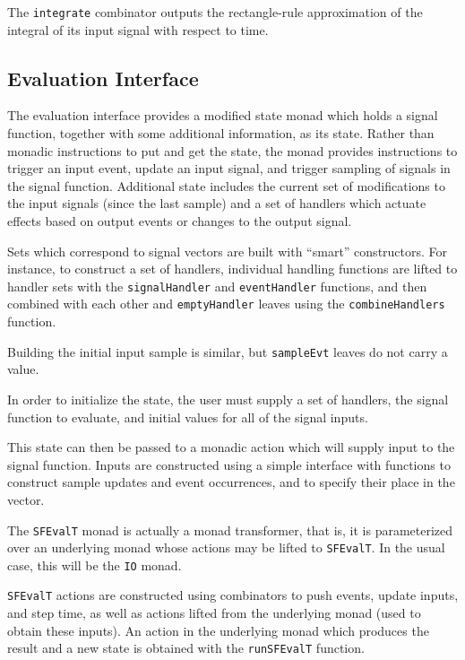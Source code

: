 The {\tt integrate} combinator outputs the rectangle-rule approximation of the
integral of its input signal with respect to time.

\subsection{Evaluation Interface}
\label{subsection:System_Design_and_Interface-Evaluation_Interface}

The evaluation interface provides a modified state monad which holds a signal
function, together with some additional information, as its state.
Rather than monadic instructions to put and get the state, the monad provides instructions
to trigger an input event, update an input signal, and trigger sampling of
signals in the signal function. Additional state includes the current set of
modifications to the input signals (since the last sample) and a set of
handlers which actuate effects based on output events or changes to the output
signal.

Sets which correspond to signal vectors are built with ``smart'' constructors.
For instance, to construct a set of handlers, individual handling functions are
lifted to handler sets with the {\tt signalHandler} and {\tt eventHandler}
functions, and then combined with each other and {\tt emptyHandler} leaves
using the {\tt combineHandlers} function.

Building the initial input sample is similar, but {\tt sampleEvt} leaves do
not carry a value.

In order to initialize the state, the user must supply a set of handlers, the
signal function to evaluate, and initial values for all of the signal inputs.

This state can then be passed to a monadic action which will supply input to
the signal function. Inputs are constructed using a simple interface with
functions to construct sample updates and event occurrences, and to specify
their place in the vector.

The {\tt SFEvalT} monad is actually a monad transformer, that is, it is
parameterized over an underlying monad whose actions may be lifted to
{\tt SFEvalT}. In the usual case, this will be the {\tt IO} monad.

{\tt SFEvalT} actions are constructed using combinators to push events,
update inputs, and step time, as well as actions lifted from the underlying
monad (used to obtain these inputs). An action in the underlying monad
which produces the result and a new state is obtained with the {\tt runSFEvalT}
function.
